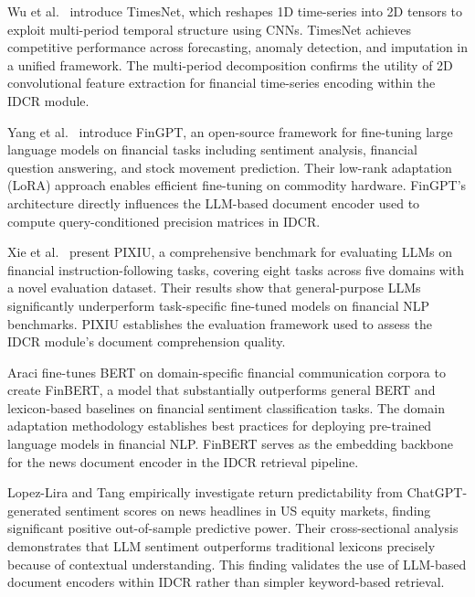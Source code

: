 \documentclass[12pt,a4paper,oneside]{report}
\theoremstyle{definition}
\theoremstyle{remark}
\begin{document}
\medskip

\noindent Wu et al.\ \cite{Wu2023TimesNet} introduce TimesNet, which reshapes 1D time-series into 2D tensors to exploit multi-period temporal structure using CNNs. TimesNet achieves competitive performance across forecasting, anomaly detection, and imputation in a unified framework. The multi-period decomposition confirms the utility of 2D convolutional feature extraction for financial time-series encoding within the IDCR module.

\medskip

\noindent Yang et al.\ \cite{Yang2023FinGPT} introduce FinGPT, an open-source framework for fine-tuning large language models on financial tasks including sentiment analysis, financial question answering, and stock movement prediction. Their low-rank adaptation (LoRA) approach enables efficient fine-tuning on commodity hardware. FinGPT's architecture directly influences the LLM-based document encoder used to compute query-conditioned precision matrices in IDCR.

\medskip

\noindent Xie et al.\ \cite{Xie2023PIXIU} present PIXIU, a comprehensive benchmark for evaluating LLMs on financial instruction-following tasks, covering eight tasks across five domains with a novel evaluation dataset. Their results show that general-purpose LLMs significantly underperform task-specific fine-tuned models on financial NLP benchmarks. PIXIU establishes the evaluation framework used to assess the IDCR module's document comprehension quality.

\medskip

\noindent Araci \cite{Araci2019FinBERT} fine-tunes BERT on domain-specific financial communication corpora to create FinBERT, a model that substantially outperforms general BERT and lexicon-based baselines on financial sentiment classification tasks. The domain adaptation methodology establishes best practices for deploying pre-trained language models in financial NLP. FinBERT serves as the embedding backbone for the news document encoder in the IDCR retrieval pipeline.

\medskip

\noindent Lopez-Lira and Tang \cite{LopezLira2023ChatGPT} empirically investigate return predictability from ChatGPT-generated sentiment scores on news headlines in US equity markets, finding significant positive out-of-sample predictive power. Their cross-sectional analysis demonstrates that LLM sentiment outperforms traditional lexicons precisely because of contextual understanding. This finding validates the use of LLM-based document encoders within IDCR rather than simpler keyword-based retrieval.
\end{document}
